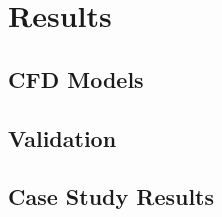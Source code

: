 \section{Results}

\subsection{CFD Models}

\subsection{Validation}

\subsection{Case Study Results}
